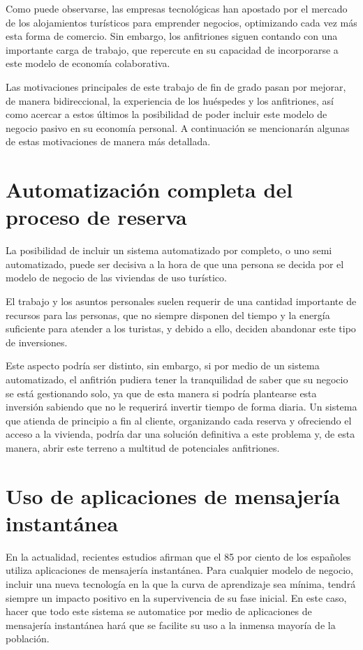 \noindent Como puede observarse, las empresas tecnológicas han apostado por el mercado de los alojamientos turísticos para emprender negocios, optimizando cada vez más esta forma de comercio. Sin embargo, los anfitriones siguen contando con una importante carga de trabajo, que repercute en su capacidad de incorporarse a este modelo de economía colaborativa.

Las motivaciones principales de este trabajo de fin de grado pasan por mejorar, de manera bidireccional, la experiencia de los huéspedes y los anfitriones, así como acercar a estos últimos la posibilidad de poder incluir este modelo de negocio pasivo en su economía personal. A continuación se mencionarán algunas de estas motivaciones de manera más detallada.

\section{Automatización completa del proceso de reserva} 
\label{sec:automatizacion-completa-del-proceso-de-reserva}

\noindent La posibilidad de incluir un sistema automatizado por completo, o uno semi automatizado, puede ser decisiva a la hora de que una persona se decida por el modelo de negocio de las viviendas de uso turístico.

El trabajo y los asuntos personales suelen requerir de una cantidad importante de recursos para las personas, que no siempre disponen del tiempo y la energía suficiente para atender a los turistas, y debido a ello, deciden abandonar este tipo de inversiones.

Este aspecto podría ser distinto, sin embargo, si por medio de un sistema automatizado, el anfitrión pudiera tener la tranquilidad de saber que su negocio se está gestionando solo, ya que de esta manera si podría plantearse esta inversión sabiendo que no le requerirá invertir tiempo de forma diaria. Un sistema que atienda de principio a fin al cliente, organizando cada reserva y ofreciendo el acceso a la vivienda, podría dar una solución definitiva a este problema y, de esta manera, abrir este terreno a multitud de potenciales anfitriones.

\section{Uso de aplicaciones de mensajería instantánea} 
\label{sec:uso-de-aplicaciones-de-mensajeria-instantanea}

\noindent En la actualidad, recientes estudios \cite{itreseller2019} afirman que el 85 por ciento de los españoles utiliza aplicaciones de mensajería instantánea. Para cualquier modelo de negocio, incluir una nueva tecnología en la que la curva de aprendizaje sea mínima, tendrá siempre un impacto positivo en la supervivencia de su fase inicial. En este caso, hacer que todo este sistema se automatice por medio de aplicaciones de mensajería instantánea hará que se facilite su uso a la inmensa mayoría de la población.

